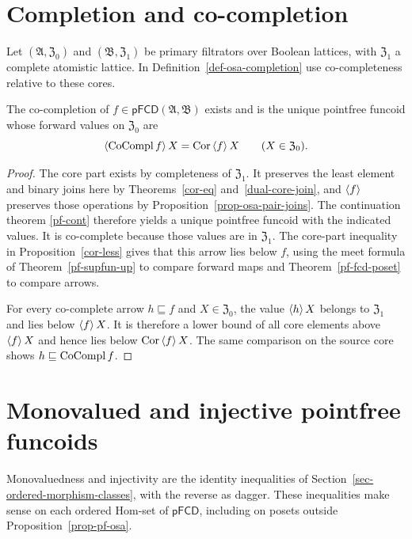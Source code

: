 \section{Completion and co-completion}
Let $(\mathfrak A,\mathfrak Z_0)$ and
$(\mathfrak B,\mathfrak Z_1)$ be primary filtrators over Boolean
lattices, with $\mathfrak Z_1$ a complete atomistic lattice.
In Definition~\ref{def-osa-completion} use co-completeness
relative to these cores.

\begin{prop}
The co-completion of $f\in\mathsf{pFCD}(\mathfrak A,\mathfrak B)$
exists and is the unique pointfree funcoid whose forward values on
$\mathfrak Z_0$ are
\[
 \left\langle \operatorname{CoCompl} f\right\rangle X=\operatorname{Cor}\left\langle f\right\rangle X
 \qquad(X\in\mathfrak Z_0).
\]
\end{prop}

\begin{proof}
The core part exists by completeness of $\mathfrak Z_1$.
It preserves the least element and binary joins here by
Theorems~\ref{cor-eq} and~\ref{dual-core-join}, and $\left\langle f\right\rangle$
preserves those operations by
Proposition~\ref{prop-osa-pair-joins}. The continuation theorem
\ref{pf-cont} therefore yields a unique pointfree funcoid
with the indicated values. It is co-complete because those
values are in $\mathfrak Z_1$. The core-part inequality
in Proposition~\ref{cor-less} gives that this arrow lies below $f$,
using the meet formula of Theorem~\ref{pf-supfun-up} to compare
forward maps and Theorem~\ref{pf-fcd-poset} to compare arrows.

For every co-complete arrow $h\sqsubseteq f$ and $X\in\mathfrak Z_0$,
the value $\left\langle h\right\rangle X$ belongs to $\mathfrak Z_1$ and lies below
$\left\langle f\right\rangle X$. It is therefore a lower bound of all core elements
above $\left\langle f\right\rangle X$ and hence lies below $\operatorname{Cor}\left\langle f\right\rangle X$.
The same comparison on the source core shows
$h\sqsubseteq\operatorname{CoCompl} f$.
\end{proof}

\section{Monovalued and injective pointfree funcoids}
Monovaluedness and injectivity are the identity inequalities of
Section~\ref{sec-ordered-morphism-classes}, with the reverse as dagger.
These inequalities make sense on each ordered Hom-set of
$\mathsf{pFCD}$, including on posets outside Proposition~\ref{prop-pf-osa}.

